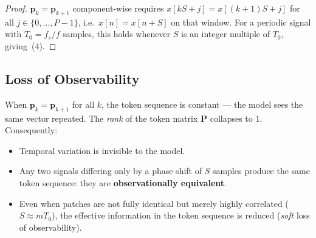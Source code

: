 \begin{proof}
    $\mathbf{p}_k = \mathbf{p}_{k+1}$ component-wise requires
    $x[kS + j] = x[(k+1)S + j]$ for all $j \in \{0,\ldots,P-1\}$,
    i.e.\ $x[n] = x[n+S]$ on that window.
    For a periodic signal with $T_0 = f_s/f$ samples, this holds whenever $S$ is an
    integer multiple of $T_0$, giving~(4).
\end{proof}

\subsection{Loss of Observability}

When $\mathbf{p}_k = \mathbf{p}_{k+1}$ for all $k$, the token sequence is constant — the
model sees the same vector repeated.  The \emph{rank} of the token matrix $\mathbf{P}$
collapses to 1.  Consequently:

\begin{itemize}
    \item Temporal variation is invisible to the model.
    \item Any two signals differing only by a phase shift of $S$ samples produce the same
          token sequence: they are \textbf{observationally equivalent}.
    \item Even when patches are not fully identical but merely highly correlated
          ($S \approx mT_0$), the effective information in the token sequence is reduced
          (\emph{soft} loss of observability).
\end{itemize}